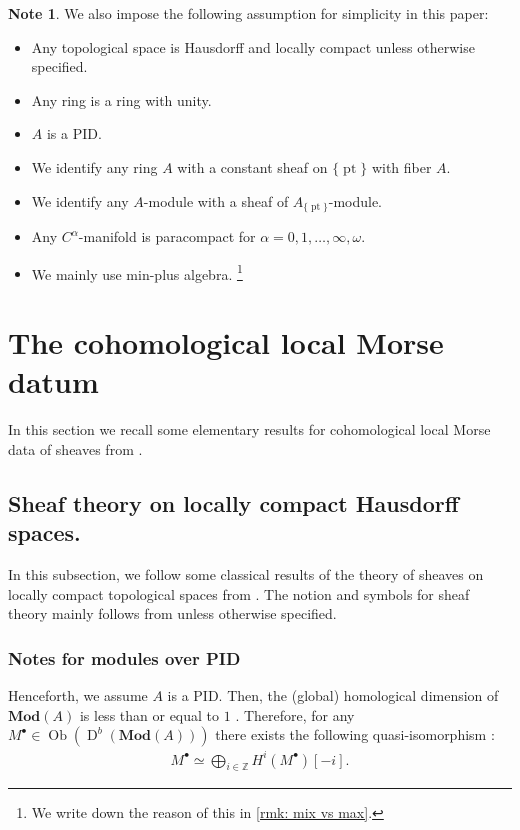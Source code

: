 \documentclass[a4paper,dvipdfmx,reqno,12pt]{amsart}
\theoremstyle{definition}
\newtheorem{Note}[theorem]{Note}
\newcommand{\Z}{\mathbb{Z}}%
\newcommand{\opn}[1]{\operatorname{#1}}
\newcommand{\catn}[1]{\mathbf{#1}}
\newcommand{\myfootnote}[1]{\hspace{-5pt}\footnote{#1}}
\numberwithin{equation}{section}
\begin{document}
\begin{Note}
We also impose the following assumption for simplicity in this paper:
\begin{itemize}
\item Any topological space is Hausdorff and
locally compact unless otherwise specified.
\item Any ring is a ring with unity.
\item $A$ is a PID.
\item We identify any ring $A$ with a constant sheaf on
$\{\opn{pt}\}$ with fiber $A$.
\item We identify any $A$-module with a sheaf of 
$A_{\{\opn{pt}\}}$-module.
\item Any $C^{\alpha}$-manifold is paracompact for 
$\alpha=0,1,\ldots,\infty,\omega$.
\item We mainly use min-plus algebra.
\myfootnote{We write down the reason of this in 
\cref{rmk: mix vs max}.}
\end{itemize}



\end{Note}

\section{The cohomological local Morse datum}
In this section we recall some elementary results
for cohomological local Morse data of sheaves from
\cite{MR2031639,MR1299726}.



\subsection{Sheaf theory on locally compact 
Hausdorff spaces.}
In this subsection, we follow some classical results of
the theory of sheaves on locally compact topological
spaces from \cite{iversenCohomologySheaves1986a,
MR1299726,MR1269324,MR2050072}.
The notion and symbols for 
sheaf theory mainly follows from \cite{MR1299726}
unless otherwise specified.

\subsubsection{Notes for modules over PID}

Henceforth, we assume $A$ is a PID. 
Then, the (global) homological dimension of 
$\catn{Mod}(A)$ is less than or equal to $1$
\cite[Exercise I.17, I.28]{MR1299726}.
Therefore, for any $M^{\bullet}\in \opn{Ob}(\opn{D}^{b}(\catn{Mod}(A)))$
there exists the following quasi-isomorphism 
\cite[Exercise I.18]{MR1299726}:
\begin{align}
M^{\bullet}\simeq 
\bigoplus_{i\in \Z}H^{i}(M^{\bullet})[-i].
\end{align}
\end{document}
